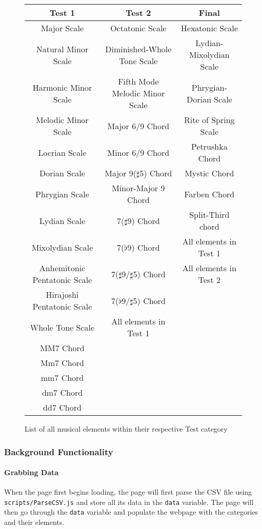 \documentclass{article}
\begin{document}
\begin{figure}
\begin{center}
\begin{tabular}{c|c|c}
\textbf{Test 1} & \textbf{Test 2} & \textbf{Final} \\
\hline
Major Scale & Octatonic Scale & Hexatonic Scale \\
Natural Minor Scale & Diminished-Whole Tone Scale & Lydian-Mixolydian Scale \\
Harmonic Minor Scale & Fifth Mode Melodic Minor Scale & Phrygian-Dorian Scale \\
Melodic Minor Scale & Major 6/9 Chord & Rite of Spring Scale \\
Locrian Scale & Minor 6/9 Chord & Petrushka Chord \\
Dorian Scale & Major 9($\sharp$5) Chord & Mystic Chord \\
Phrygian Scale & Minor-Major 9 Chord & Farben Chord \\
Lydian Scale & 7($\sharp$9) Chord & Split-Third chord \\
Mixolydian Scale & 7($\flat$9) Chord & All elements in Test 1 \\
Anhemitonic Pentatonic Scale & 7($\sharp$9/$\sharp$5) Chord & All elements in Test 2\\
Hirajoshi Pentatonic Scale & 7($\flat$9/$\sharp$5) Chord & \\
Whole Tone Scale & All elements in Test 1 & \\
MM7 Chord & & \\
Mm7 Chord & & \\
mm7 Chord & & \\
dm7 Chord & & \\
dd7 Chord & & \\
\end{tabular}
\end{center}
\caption{List of all musical elements within their respective Test category}
\label{fig:testtable}
\end{figure}

\subsubsection{Background Functionality}
\paragraph{Grabbing Data}
When the page first begins loading, the page will first parse the CSV file using \texttt{scripts/ParseCSV.js} and store all its data in the \texttt{data} variable. The page will then go through the \texttt{data} variable and populate the webpage with the categories and their elements.
\end{document}
